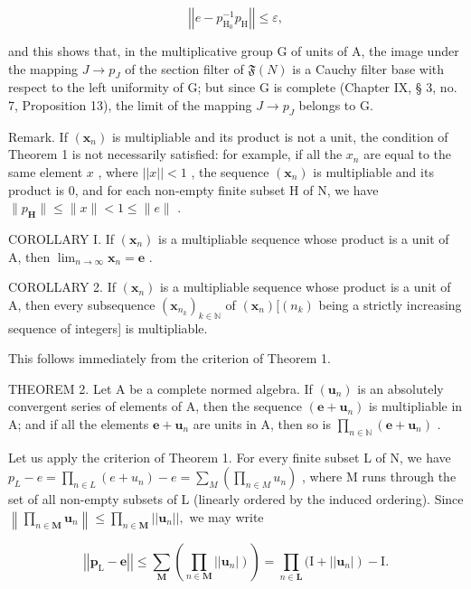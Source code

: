 \[
\left| \left| e - p _ {\mathrm{H} _ {0}} ^ {- 1} p _ {\mathrm{H}} \right| \right| \leqslant \varepsilon ,
\]

and this shows that, in the multiplicative group G of units of A, the image under the mapping \(J \rightarrow p_{J}\) of the section filter of \(\mathfrak{F}(N)\) is a Cauchy filter base with respect to the left uniformity of G; but since G is complete (Chapter IX, § 3, no. 7, Proposition 13), the limit of the mapping \(J \rightarrow p_{J}\) belongs to G.

Remark. If \((\pmb{x}_n)\) is multipliable and its product is not a unit, the condition of Theorem 1 is not necessarily satisfied: for example, if all the \(x_n\) are equal to the same element \(x\) , where \(||x|| < 1\) , the sequence \((\pmb{x}_n)\) is multipliable and its product is 0, and for each non-empty finite subset H of N, we have \(\| p_{\mathbf{H}} \| \leqslant \| x \| < 1 \leqslant \| e \|\) .

COROLLARY I. If \((\pmb{x}_n)\) is a multipliable sequence whose product is a unit of A, then \(\lim_{n\to \infty}\pmb{x}_n = \pmb{e}\) .

COROLLARY 2. If \((\pmb{x}_n)\) is a multipliable sequence whose product is a unit of A, then every subsequence \((\pmb{x}_{n_k})_{k\in \mathbb{N}}\) of \((\pmb{x}_n)[(n_k)\) being a strictly increasing sequence of integers{]} is multipliable.

This follows immediately from the criterion of Theorem 1.

THEOREM 2. Let A be a complete normed algebra. If \((\pmb{u}_n)\) is an absolutely convergent series of elements of A, then the sequence \((\pmb{e} + \pmb{u}_n)\) is multipliable in A; and if all the elements \(\pmb{e} + \pmb{u}_n\) are units in A, then so is \(\prod_{n\in \mathbb{N}}(\pmb {e} + \pmb{u}_n)\) .

Let us apply the criterion of Theorem 1. For every finite subset L of N, we have \(p_{L} - e = \prod_{n \in L} (e + u_n) - e = \sum_{M} \left( \prod_{n \in M} u_n \right)\) , where M runs through the set of all non-empty subsets of L (linearly ordered by the induced ordering). Since \(\left\| \prod_{n\in \mathbf{M}}\pmb {u}_n\right\| \leqslant \prod_{n\in \mathbf{M}}||\pmb {u}_n||,\) we may write

\[
\left| \left| \boldsymbol {p} _ {\mathrm{L}} - \boldsymbol {e} \right| \right| \leqslant \sum_ {\mathbf {M}} \left(\prod_ {n \in \mathbf {M}} \left| \left| \boldsymbol {u} _ {n} \right|\right)\right) = \prod_ {n \in \mathbf {L}} (\mathrm{I} + \left| \left| \boldsymbol {u} _ {n} \right|\right) - \mathrm{I}.
\]

